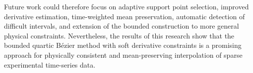 \documentclass[12pt,a4paper]{article}
\begin{document}
Future work could therefore focus on adaptive support point selection,
improved derivative estimation, time-weighted mean preservation, automatic
detection of difficult intervals, and extension of the bounded construction
to more general physical constraints. Nevertheless, the results of this research
show that the bounded quartic B\'ezier method with soft derivative constraints
is a promising approach for physically consistent and mean-preserving
interpolation of sparse experimental time-series data.

\clearpage
\printbibliography[heading=bibintoc,title={References}]

\clearpage
{}
{}
\listoffigures

\clearpage
{}
{}
\listoftables

\clearpage
{}
{}
\lstlistoflistings
\end{document}
